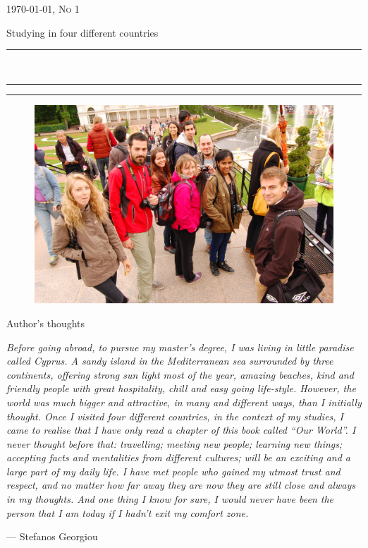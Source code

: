 \documentclass[10pt,a4paper]{article} %
\newcommand{\HorRule}[1]{\noindent\rule{\linewidth}{#1}} %
\newcommand{\SepRule}{\noindent	%
\begin{center}
\rule{250pt}{1pt} %
\end{center}
}
\newcommand{\NewsletterName}[1]{ %
\begin{center}
\Huge \usefont{T1}{fvs}{b}{n} %
#1
\end{center}	
\par \normalsize \normalfont}
\newcommand{\JournalIssue}[1]{ %
\hfill \textsc{\mydate \today, No #1} %
\par \normalsize \normalfont}
\newcommand{\NewsItem}[1]{ %
\usefont{T1}{fvs}{n}{n} %
\vspace{24pt}\large #1\vspace{3pt} %
\par \normalsize \normalfont}
\begin{document}
\JournalIssue{1} %

\NewsletterName{Studying in four different countries} %

\noindent\HorRule{3pt} \\[-0.75\baselineskip] %
\HorRule{1pt} %


\vspace{0.5cm}
\SepRule
\vspace{-0.5cm}

\begin{center}
\begin{minipage}[h]{0.75\linewidth}
\begin{figure}
\includegraphics[width=0.45 \textwidth]{media/front_picture.jpg}
\\
\end{figure}
	
\NewsItem{Author's thoughts} %
\vspace{3pt} %
\textit{
Before going abroad, to pursue my master's degree, I was living in little 
paradise called Cyprus. 
A sandy island in the Mediterranean sea surrounded by three continents, 
offering strong sun light most of the year, amazing beaches, kind and friendly people 
with great hospitality, chill and easy going life-style. 
However, the world was much bigger and attractive, in many and different ways, than 
I initially thought.
Once I visited four different countries, in the context of my studies, I came to 
realise that I have only read a chapter of this book called ``Our World''. 
I never thought before that: travelling; meeting new people; learning new things; 
accepting facts and mentalities from different cultures; will be an exciting and 
a large part of my daily life. 
I have met people who gained my utmost trust and respect, and no matter how far 
away they are now they are still close and always in my thoughts.   
And one thing I know for sure, I would never have been the person that I am today 
if I hadn't exit my comfort zone.
}
\par\hfill --- Stefanos Georgiou
\end{minipage}
\end{center}
\end{document}
